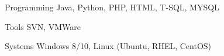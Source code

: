 

\begin{cvskills}

  \cvskill
    {Programming} %
    {Java, Python, PHP, HTML, T-SQL, MYSQL} %

  \cvskill
    {Tools} %
    {SVN, VMWare} %

  \cvskill
    {Systems} %
    {Windows 8/10, Linux (Ubuntu, RHEL, CentOS)} %

\end{cvskills}

